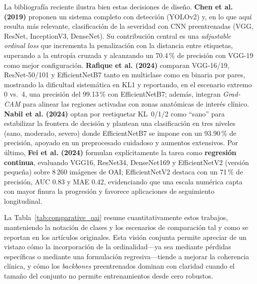 \documentclass[11pt,spanish,listoffigures,listoftables]{tfgetsinf}
\begin{document}
La bibliografía reciente ilustra bien estas decisiones de diseño. \textbf{Chen
	et al. (2019)} \cite{chen2019fully} proponen un sistema completo con detección
(YOLOv2) y, en lo que aquí resulta más relevante, clasificación de la severidad
con CNN preentrenadas (VGG, ResNet, InceptionV3, DenseNet). Su contribución
central es una \emph{adjustable ordinal loss} que incrementa la penalización
con la distancia entre etiquetas, superando a la entropía cruzada y alcanzando
un 70{.}4\,\% de precisión con VGG-19 como mejor configuración.
\textbf{Rafique et al. (2024)} \cite{rafique2024knee} comparan VGG-16/19,
ResNet-50/101 y EfficientNetB7 tanto en multiclase como en binaria por pares,
mostrando la dificultad sistemática en KL1 y reportando, en el escenario
extremo 0 vs.\ 4, una precisión del 99{.}13\,\% con EfficientNetB7; además,
integran \emph{Grad-CAM} para alinear las regiones activadas con zonas
anatómicas de interés clínico. \textbf{Nabil et al. (2024)}
\cite{nabil2024automatic} optan por reetiquetar KL~0/1/2 como ``sano'' para
estabilizar la frontera de decisión y plantean una clasificación en tres
niveles (sano, moderado, severo) donde EfficientNetB7 se impone con un
93{.}90\,\% de precisión, apoyado en un preprocesado cuidadoso y aumentos
extensivos. Por último, \textbf{Fei et al. (2024)} \cite{fei2024diagnosing}
formulan explícitamente la tarea como \textbf{regresión continua}, evaluando
VGG16, ResNet34, DenseNet169 y EfficientNetV2 (versión pequeña) sobre 8\,260
imágenes de OAI; EfficientNetV2 destaca con un 71\,\% de precisión, AUC
0{.}83 y MAE 0{.}42, evidenciando que una escala  numérica capta con mayor
finura la progresión y favorece aplicaciones de seguimiento longitudinal.

La Tabla~\ref{tab:comparative_oai} resume cuantitativamente estos trabajos,
manteniendo la notación de clases y los escenarios de comparación tal y como se
reportan en los artículos originales. Esta visión conjunta permite apreciar de
un vistazo cómo la incorporación de la ordinalidad—ya sea mediante pérdidas
específicas o mediante una formulación regresiva—tiende a mejorar la coherencia
clínica, y cómo los \emph{backbones} preentrenados dominan con claridad cuando
el tamaño del conjunto no permite entrenamientos desde cero robustos.
\end{document}
